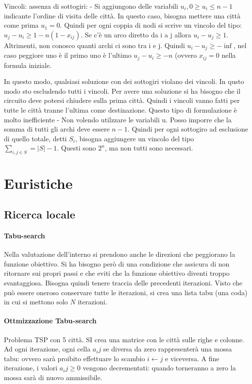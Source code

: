 \documentclass{article}
\begin{document}
Vincoli: assenza di sottogiri:
 -  Si aggiungono delle variabili $u_i,0\geq u_i \leq n-1$ indicante l'ordine 
 di visita delle città. In questo caso, bisogna mettere una città come prima 
 $u_1 = 0$. Quindi per ogni coppia di nodi si scrive un vincolo del tipo:
$u_j - u_i \geq 1-n (1-x_{ij})$. Se c'è un arco diretto da i a j allora
$u_i -u_j \geq 1$. Altrimenti, non conosco quanti archi ci sono tra i e j. Quindi 
$u_i - u_j \geq -\inf$, nel caso peggiore uno è il primo uno è l'ultimo 
$u_j - u_i \geq -n$ (ovvero  $x_{ij} = 0$ nella formula iniziale.  

In questo modo, qualsiasi soluzione con dei sottogiri violano dei vincoli. In 
qusto modo sto escludendo tutti i vincoli. Per avere una soluzione si ha bisogno 
che il circuito deve potersi chiudere sulla prima città. Quindi i vincoli vanno 
fatti per tutte le città tranne l'ultima come destinazione. Questo tipo di 
formulazione è molto inefficiente
- Non volendo utilzzare le variabili u. Posso imporre che la somma di tutti gli 
archi deve essere $n-1$. Quindi per ogni sottogiro ad esclusione di quello 
totale, detti $S_i$, bisogna aggiungere un vincolo del tipo 
$\sum_{i,j\in S} = |S|-1$. Questi sono $2^n$, ma non tutti sono necessari.


\section{Euristiche}


\subsection{Ricerca locale}

\paragraph{Tabu-search}
Nella valutazione dell'interno si prendono anche le direzioni che peggiorano 
la funzione obiettivo. Si ha bisogno però di una condizione che assicura di 
non ritornare sui propri passi e che eviti che la funzione obiettivo diventi 
troppo svantaggiosa. Bisogna quindi tenere traccia delle precedenti iterazioni.
Visto che può essere oneroso conservare tutte le iterazioni, si crea una lista 
tabu (una coda) in cui si mettono solo $N$ iterazioni.


\paragraph{Ottmizzazione Tabu-search}
Problema TSP con 5 città. SI crea una matrice con le città sulle righe e colonne. 
Ad ogni iterazione, ogni cella $a_ij$ se diversa da zero rappresenterà una mossa 
tabu: ovvero sarà proibito effettuare lo scambio $i \leftarrow j$ e viceversa. A 
fine iterazione, i valori $a_ij \geq 0$ vengono decrementati: quando torneranno 
a zero la mossa sarà di nuovo ammissibile.
\end{document}
